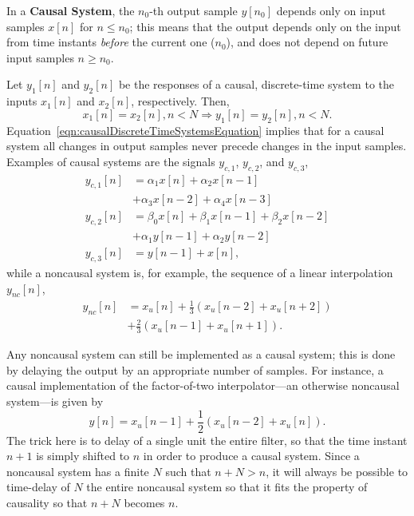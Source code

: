 \documentclass[\documentfontsize, twocolumn]{\classname}
\begin{document}
In a \textbf{Causal System}, the $n_0$-th output sample $y[n_0]$ depends only on input samples $x[n]$ for $n\leq n_0$; this means that the output depends only on the input from time instants \emph{before} the current one ($n_0$), and does not depend on future input samples $n \geq n_0$.

Let $y_1[n]$ and $y_2[n]$ be the responses of a causal, discrete-time system to the inputs $x_1[n]$ and $x_2[n]$, respectively. Then, \begin{equation}\label{eqn:causalDiscreteTimeSystemsEquation}x_1[n] = x_2[n], n < N \Longrightarrow y_1[n] = y_2[n], n < N.\end{equation}
Equation~\ref{eqn:causalDiscreteTimeSystemsEquation} implies that for a causal system all changes in output samples never precede changes in the input samples.
Examples of causal systems are the signals $y_{c,1}$, $y_{c,2}$, and $y_{c,3}$,
\begin{align*}
    y_{c,1}[n] &= \alpha_1 x[n] + \alpha_2 x[n-1]\\
               &+ \alpha_3 x[n-2] + \alpha_4 x[n-3]\\
    y_{c,2}[n] &= \beta_0 x[n] + \beta_1 x[n-1] + \beta_2 x[n-2]\\
               &+ \alpha_1 y[n-1] + \alpha_2 y[n-2]\\
    y_{c,3}[n] &= y[n-1] + x[n],
\end{align*}
while a noncausal system is, for example, the sequence of a linear interpolation $y_{nc}[n]$,
\begin{align*}
    y_{nc}[n] &= x_u[n] + \frac 1 3(x_u[n-2] + x_u[n+2])\\
           &+ \frac 2 3(x_u[n-1] + x_u[n+1]).
\end{align*}

Any noncausal system can still be implemented as a causal system; this is done by delaying the output by an appropriate number of samples. For instance, a causal implementation of the factor-of-two interpolator---an otherwise noncausal system---is given by
\begin{equation}\label{eqn:causalLinearInterpolationFactorTwo}
    y[n] = x_u[n-1] + \frac 1 2(x_u[n-2] + x_u[n]).
\end{equation}
The trick here is to delay of a single unit the entire filter, so that the time instant $n+1$ is simply shifted to $n$ in order to produce a causal system. Since a noncausal system has a finite $N$ such that $n+N > n$, it will always be possible to time-delay of $N$ the entire noncausal system so that it fits the property of causality so that $n + N$ becomes $n$.
\end{document}
